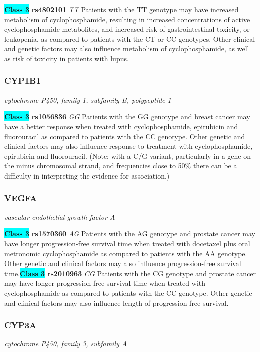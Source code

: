 \documentclass{report}
\begin{document}
\textbf{\colorbox{cyan} {Class 3}} \textbf{ rs4802101 } \textit{ TT }
Patients with the TT genotype may have increased metabolism of cyclophosphamide, resulting in increased concentrations of active cyclophosphamide metabolites, and increased risk of gastrointestinal toxicity, or leukopenia, as compared to patients with the CT or CC genotypes. Other clinical and genetic factors may also influence metabolism of cyclophosphamide, as well as risk of toxicity in patients with lupus.\newline\subsubsection{ CYP1B1 }
\textit{ cytochrome P450, family 1, subfamily B, polypeptide 1 }

\textbf{\colorbox{cyan} {Class 3}} \textbf{ rs1056836 } \textit{ GG }
Patients with the GG genotype and breast cancer may have a better response when treated with cyclophosphamide, epirubicin and fluorouracil as compared to patients with the CC genotype. Other genetic and clinical factors may also influence response to treatment with cyclophosphamide, epirubicin and fluorouracil.  (Note: with a C/G variant, particularly in a gene on the minus chromosomal strand, and frequencies close to 50\% there can be a difficulty in interpreting the evidence for association.)\newline\subsubsection{ VEGFA }
\textit{ vascular endothelial growth factor A }

\textbf{\colorbox{cyan} {Class 3}} \textbf{ rs1570360 } \textit{ AG }
Patients with the AG genotype and prostate cancer may have longer progression-free survival time when treated with docetaxel plus oral metronomic cyclophosphamide as compared to patients with the AA genotype. Other genetic and clinical factors may also influence progression-free survival time.\newline\textbf{\colorbox{cyan} {Class 3}} \textbf{ rs2010963 } \textit{ CG }
Patients with the CG genotype and prostate cancer may have longer progression-free survival time when treated with cyclophosphamide as compared to patients with the CC genotype. Other genetic and clinical factors may also influence length of progression-free survival.\newline\subsubsection{ CYP3A }
\textit{ cytochrome P450, family 3, subfamily A }
\end{document}
